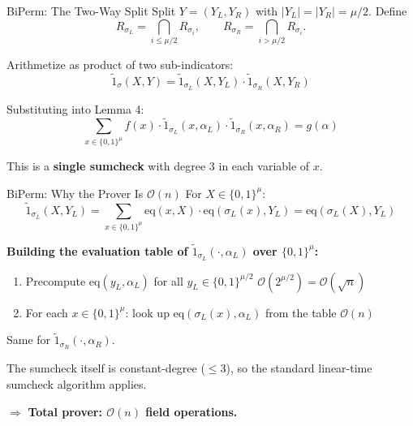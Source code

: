 \documentclass[aspectratio=169,10pt]{beamer}
\newcommand{\B}{\{0,1\}}
\newcommand{\eq}{\mathrm{eq}}
\newcommand{\wt}[1]{\widetilde{#1}}
\newcommand{\bigO}{\mathcal{O}}
\begin{document}

\begin{frame}{BiPerm: The Two-Way Split}
Split $Y = (Y_L, Y_R)$ with $|Y_L| = |Y_R| = \mu/2$. Define
\[
  R_{\sigma_L} = \bigcap_{i \le \mu/2} R_{\sigma_i}, \qquad R_{\sigma_R} = \bigcap_{i > \mu/2} R_{\sigma_i}.
\]

Arithmetize as product of two sub-indicators:
\[
  \wt{1}_\sigma(X, Y) = \wt{1}_{\sigma_L}(X, Y_L) \cdot \wt{1}_{\sigma_R}(X, Y_R)
\]

Substituting into Lemma 4:
\[
  \boxed{\sum_{x \in \B^\mu} f(x) \cdot \wt{1}_{\sigma_L}(x, \alpha_L) \cdot \wt{1}_{\sigma_R}(x, \alpha_R) = g(\alpha)}
\]

This is a \textbf{single sumcheck} with degree 3 in each variable of $x$.
\end{frame}

\begin{frame}{BiPerm: Why the Prover Is $\bigO(n)$}
For $X \in \B^\mu$:
\[
  \wt{1}_{\sigma_L}(X, Y_L) = \sum_{x \in \B^\mu} \eq(x, X) \cdot \eq(\sigma_L(x), Y_L) = \eq(\sigma_L(X), Y_L)
\]

\textbf{Building the evaluation table of $\wt{1}_{\sigma_L}(\cdot, \alpha_L)$ over $\B^\mu$:}
\begin{enumerate}
  \item Precompute $\eq(y_L, \alpha_L)$ for all $y_L \in \B^{\mu/2}$ \hfill $\bigO(2^{\mu/2}) = \bigO(\sqrt{n})$
  \item For each $x \in \B^\mu$: look up $\eq(\sigma_L(x), \alpha_L)$ from the table \hfill $\bigO(n)$
\end{enumerate}
Same for $\wt{1}_{\sigma_R}(\cdot, \alpha_R)$.

\vspace{0.6em}
The sumcheck itself is constant-degree ($\le 3$), so the standard linear-time sumcheck algorithm applies.

\vspace{0.6em}
$\Rightarrow$ \textbf{Total prover: $\bigO(n)$ field operations.}
\end{frame}
\end{document}
